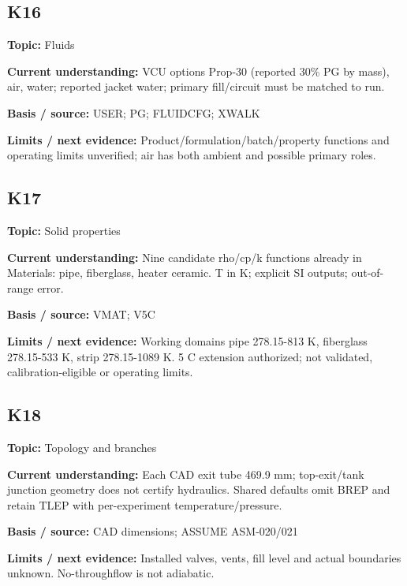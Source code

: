 \documentclass[11pt]{article}
\begin{document}
\par\noindent\begin{minipage}{\textwidth}\small\setlength{\parskip}{2pt}
\subsection*{K16}
\textbf{Topic:} Fluids\par
\textbf{Current understanding:} VCU options Prop-30 (reported 30\% PG by mass), air, water; reported jacket water; primary fill/circuit must be matched to run.\par
\textbf{Basis / source:} USER; PG; FLUIDCFG; XWALK\par
\textbf{Limits / next evidence:} Product/formulation/batch/property functions and operating limits unverified; air has both ambient and possible primary roles.\par
\end{minipage}\par\vspace{5pt}
\par\noindent\begin{minipage}{\textwidth}\small\setlength{\parskip}{2pt}
\subsection*{K17}
\textbf{Topic:} Solid properties\par
\textbf{Current understanding:} Nine candidate rho/cp/k functions already in Materials: pipe, fiberglass, heater ceramic. T in K; explicit SI outputs; out-of-range error.\par
\textbf{Basis / source:} VMAT; V5C\par
\textbf{Limits / next evidence:} Working domains pipe 278.15-813 K, fiberglass 278.15-533 K, strip 278.15-1089 K. 5 C extension authorized; not validated, calibration-eligible or operating limits.\par
\end{minipage}\par\vspace{5pt}
\par\noindent\begin{minipage}{\textwidth}\small\setlength{\parskip}{2pt}
\subsection*{K18}
\textbf{Topic:} Topology and branches\par
\textbf{Current understanding:} Each CAD exit tube 469.9 mm; top-exit/tank junction geometry does not certify hydraulics. Shared defaults omit BREP and retain TLEP with per-experiment temperature/pressure.\par
\textbf{Basis / source:} CAD dimensions; ASSUME ASM-020/021\par
\textbf{Limits / next evidence:} Installed valves, vents, fill level and actual boundaries unknown. No-throughflow is not adiabatic.\par
\end{minipage}\par\vspace{5pt}
\end{document}
